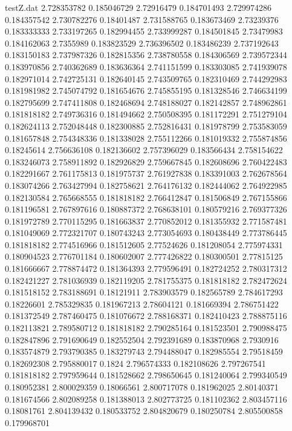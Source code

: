 \begin{filecontents*}{testZ.dat}
2.728353782  0.185046729
2.72916479  0.184701493
2.729974286  0.184357542
2.730782276  0.18401487
2.731588765  0.183673469
2.73239376  0.183333333
2.733197265  0.182994455
2.733999287  0.184501845
2.73479983  0.184162063
2.7355989  0.183823529
2.736396502  0.183486239
2.737192643  0.183150183
2.737987326  0.182815356
2.738780558  0.184306569
2.739572344  0.183970856
2.740362689  0.183636364
2.741151599  0.183303085
2.741939078  0.182971014
2.742725131  0.182640145
2.743509765  0.182310469
2.744292983  0.181981982
2.745074792  0.181654676
2.745855195  0.181328546
2.746634199  0.182795699
2.747411808  0.182468694
2.748188027  0.182142857
2.748962861  0.181818182
2.749736316  0.181494662
2.750508395  0.181172291
2.751279104  0.182624113
2.752048448  0.182300885
2.752816431  0.181978799
2.753583059  0.181657848
2.754348336  0.181338028
2.755112266  0.181019332
2.755874856  0.18245614
2.756636108  0.182136602
2.757396029  0.183566434
2.758154622  0.183246073
2.758911892  0.182926829
2.759667845  0.182608696
2.760422483  0.182291667
2.761175813  0.181975737
2.761927838  0.183391003
2.762678564  0.183074266
2.763427994  0.182758621
2.764176132  0.182444062
2.764922985  0.182130584
2.765668555  0.181818182
2.766412847  0.181506849
2.767155866  0.181196581
2.767897616  0.180887372
2.768638101  0.180579216
2.769377326  0.181972789
2.770115295  0.181663837
2.770852012  0.181355932
2.771587481  0.181049069
2.772321707  0.180743243
2.773054693  0.180438449
2.773786445  0.181818182
2.774516966  0.181512605
2.77524626  0.181208054
2.775974331  0.180904523
2.776701184  0.180602007
2.777426822  0.180300501
2.77815125  0.181666667
2.778874472  0.181364393
2.779596491  0.182724252
2.780317312  0.182421227
2.781036939  0.182119205
2.781755375  0.181818182
2.782472624  0.181518152
2.783188691  0.18121911
2.783903579  0.182565789
2.784617293  0.18226601
2.785329835  0.181967213
2.78604121  0.181669394
2.786751422  0.181372549
2.787460475  0.181076672
2.788168371  0.182410423
2.788875116  0.182113821
2.789580712  0.181818182
2.790285164  0.181523501
2.790988475  0.182847896
2.791690649  0.182552504
2.792391689  0.183870968
2.7930916  0.183574879
2.793790385  0.183279743
2.794488047  0.182985554
2.79518459  0.182692308
2.795880017  0.1824
2.796574333  0.182108626
2.797267541  0.181818182
2.797959644  0.181528662
2.798650645  0.181240064
2.799340549  0.180952381
2.800029359  0.18066561
2.800717078  0.181962025
2.80140371  0.181674566
2.802089258  0.181388013
2.802773725  0.181102362
2.803457116  0.18081761
2.804139432  0.180533752
2.804820679  0.180250784
2.805500858  0.179968701

\end{filecontents*}
